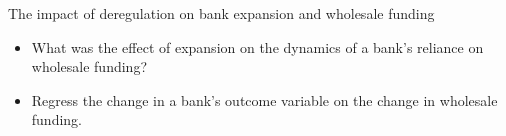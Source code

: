 \documentclass[notes,10pt, aspectratio=169]{beamer}
\begin{document}
        \begin{frame}{The impact of deregulation on bank expansion and wholesale funding \hyperlink{der_impact}{}
            }\label{der_impact1}
            \begin{itemize}
                \item What was the effect of expansion on the dynamics of a bank’s reliance on wholesale funding? %
     
                \item Regress the change in a bank's outcome variable on the change in wholesale funding.
    
        
            \end{itemize}
    

\end{frame}
\end{document}
